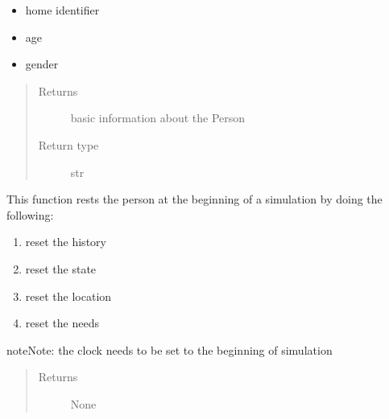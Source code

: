 \documentclass[letterpaper,10pt,english]{sphinxmanual}
\begin{document}
\begin{fulllineitems}
\begin{fulllineitems}
\begin{itemize}
\item {} 
home identifier

\item {} 
age

\item {} 
gender

\end{itemize}
\begin{quote}\begin{description}
\item[{Returns}] \leavevmode
basic information about the Person

\item[{Return type}] \leavevmode
str

\end{description}\end{quote}

\end{fulllineitems}


\begin{fulllineitems}
\label{person:person.Person.reset}
This function rests the person at the beginning of a simulation by doing the following:
\begin{enumerate}
\item {} 
reset the history

\item {} 
reset the state

\item {} 
reset the location

\item {} 
reset the needs

\end{enumerate}

\begin{notice}{note}{Note:}
the clock needs to be set to the beginning of simulation
\end{notice}
\begin{quote}\begin{description}
\item[{Returns}] \leavevmode
None

\end{description}\end{quote}

\end{fulllineitems}



\end{fulllineitems}
\end{document}
